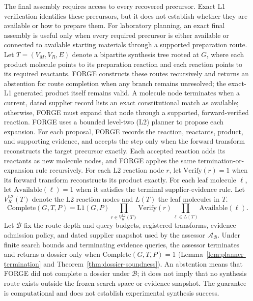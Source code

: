 \documentclass{article}
\begin{document}
The final assembly requires access to every recovered precursor.
Exact L1 verification identifies these precursors, but it does not establish whether they are
available or how to prepare them.
For laboratory planning, an exact final assembly is useful only when every required precursor is
either available or connected to available starting materials through a supported preparation
route.
Let $T=(V_M,V_R,E)$ denote a bipartite synthesis tree rooted at $G$, where each product molecule
points to its preparation reaction and each reaction points to its required reactants.
FORGE constructs these routes recursively and returns an abstention for route completion when any
branch remains unresolved; the exact-L1 generated product itself remains valid.
A molecule node terminates when a current, dated supplier record lists an exact constitutional match
as available; otherwise, FORGE must expand that node through a supported, forward-verified reaction.
FORGE uses a bounded level-two (L2) planner to propose each expansion.
For each proposal, FORGE records the reaction, reactants, product, and supporting evidence, and
accepts the step only when the forward transform reconstructs the target precursor exactly.
Each accepted reaction adds its reactants as new molecule nodes, and FORGE applies the same
termination-or-expansion rule recursively.
For each L2 reaction node $r$, let $\mathrm{Verify}(r)=1$ when its forward transform reconstructs its
product exactly.
For each leaf molecule $\ell$, let $\mathrm{Available}(\ell)=1$ when it satisfies the terminal
supplier-evidence rule.
Let $V_R^{\mathrm{L2}}(T)$ denote the L2 reaction nodes and $L(T)$ the leaf molecules in $T$.
\begin{equation}
    \mathrm{Complete}(G,T,P)
    =
    \mathrm{L1}(G,P)
    \prod_{r\in V_R^{\mathrm{L2}}(T)}\mathrm{Verify}(r)
    \prod_{\ell\in L(T)}\mathrm{Available}(\ell).
\end{equation}
Let $\mathcal{B}$ fix the route-depth and query budgets, registered transforms, evidence-admission
policy, and dated supplier snapshot used by the assessor $\mathcal{A}_{\mathcal{B}}$.
Under finite search bounds and terminating evidence queries, the assessor terminates and returns a
dossier only when $\mathrm{Complete}(G,T,P)=1$
(Lemma~\ref{lem:planner-termination} and Theorem~\ref{thm:dossier-soundness}).
An abstention means that FORGE did not complete a dossier under $\mathcal{B}$; it does not imply that
no synthesis route exists outside the frozen search space or evidence snapshot.
The guarantee is computational and does not establish experimental synthesis success.
\end{document}
